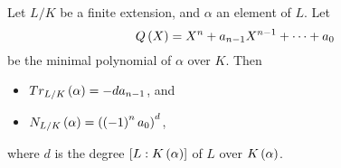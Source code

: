 \pagebreak


\begin{proposition}
\label{prop:12.2.2}
Let $ L / K $ be a finite extension, and $ \alpha $ an element of $ L $. Let
$$ Q\left( X \right) = X^n + a_{n - 1}X^{n - 1} + \dots + a_0 $$
be the minimal polynomial of $ \alpha $ over $ K $. Then
\begin{itemize}
\item $ Tr_{L / K}\left( \alpha \right) = -da_{n - 1} $, and
\item $ N_{L / K}\left( \alpha \right) = \left( \left( -1 \right)^na_0 \right)^d $,
\end{itemize}
where $ d $ is the degree $ \left[ L : K\left( \alpha \right) \right] $ of $ L $ over $ K\left( \alpha \right) $.
\end{proposition}

